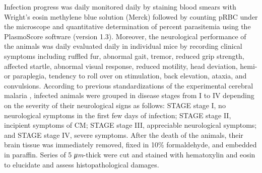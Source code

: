\documentclass[empirical, authordate]{jote-new-article}
\begin{document}
\begin{figure}[h!]
  \begin{fullwidth}
    \caption{}
    \label{fig:2}
  \end{fullwidth}
\end{figure}



Infection progress was daily monitored daily by staining blood smears with Wright's eosin methylene blue solution (Merck) followed by counting pRBC under the microscope and quantitative determination of percent parasitemia using the PlasmoScore software (version 1.3). Moreover, the neurological performance of the animals was daily evaluated daily in individual mice by recording clinical symptoms including ruffled fur, abnormal gait, tremor, reduced grip strength, affected startle, abnormal visual response, reduced motility, head deviation, hemi- or paraplegia, tendency to roll over on stimulation, back elevation, ataxia, and convulsions. According to previous standardizations of the experimental cerebral malaria \parencite{Martinez2013, Linares2013}, infected animals were grouped in disease stages from I to IV depending on the severity of their neurological signs as follows: STAGE stage I, no neurological symptoms in the first few days of infection; STAGE stage II, incipient symptoms of CM; STAGE stage III, appreciable neurological symptoms; and STAGE stage IV, severe symptoms. After the death of the animals, their brain tissue was immediately removed, fixed in 10\% formaldehyde, and embedded in paraffin. Series of 5 \emph{μm}-thick were cut and stained with hematoxylin and eosin to elucidate and assess histopathological damages.
\end{document}
